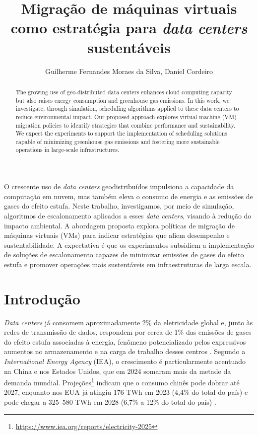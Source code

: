 \documentclass[12pt]{article}
\title{Migração de máquinas virtuais como estratégia para \textit{data centers} sustentáveis}
\author{Guilherme Fernandes Moraes da Silva\inst{1}, Daniel Cordeiro\inst{1}}
\begin{document}
 

\maketitle

\begin{abstract}
The growing use of geo-distributed data centers enhances cloud computing capacity but also raises energy consumption and greenhouse gas emissions. In this work, we investigate, through simulation, scheduling algorithms applied to these data centers to reduce environmental impact. Our proposed approach explores virtual machine (VM) migration policies to identify strategies that combine performance and sustainability. We expect the experiments to support the implementation of scheduling solutions capable of minimizing greenhouse gas emissions and fostering more sustainable operations in large-scale infrastructures.
\end{abstract}
     
\begin{resumo}
O crescente uso de \textit{data centers} geodistribuídos impulsiona a capacidade da computação em nuvem, mas também eleva o consumo de energia e as emissões de gases do efeito estufa. Neste trabalho, investigamos, por meio de simulação, algoritmos de escalonamento aplicados a esses \textit{data centers}, visando à redução do impacto ambiental. A abordagem proposta explora políticas de migração de máquinas virtuais (VMs) para indicar estratégias que aliem desempenho e sustentabilidade. A expectativa é que os experimentos subsidiem a implementação de soluções de escalonamento capazes de minimizar emissões de gases do efeito estufa e promover operações mais sustentáveis em infraestruturas de larga escala.
\end{resumo}

\section{Introdução}
\textit{Data centers} já consomem aproximadamente 2\% da eletricidade global e, junto às redes de transmissão de dados, respondem por cerca de 1\% das emissões de gases do efeito estufa associadas à energia, fenômeno potencializado pelos expressivos aumentos no armazenamento e na carga de trabalho desses centros \cite{masanet:20}. Segundo a \textit{International Energy Agency} (IEA), o crescimento é particularmente acentuado na China e nos Estados Unidos, que em 2024 somaram mais da metade da demanda mundial. Projeções\footnote{\url{https://www.iea.org/reports/electricity-2025}} indicam que o consumo chinês pode dobrar até 2027, enquanto nos EUA já atingiu 176 TWh em 2023 (4,4\% do total do país) e pode chegar a 325–580 TWh em 2028 (6,7\% a 12\% do total do país) \cite{shehabi:24}.
\end{document}
